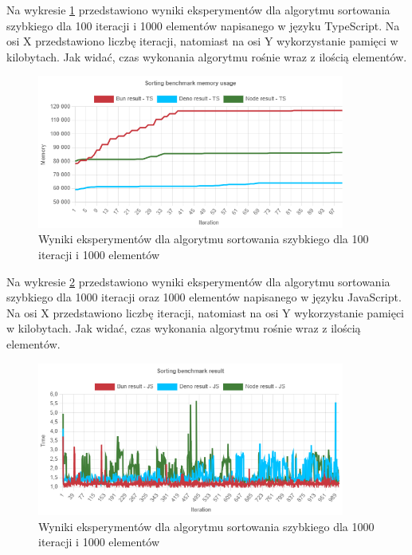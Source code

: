 Na wykresie \ref{fig:quick_sorting_e2_memory_ts} przedstawiono wyniki eksperymentów dla algorytmu sortowania szybkiego dla 100 iteracji i 1000 elementów napisanego w języku TypeScript. Na osi X przedstawiono liczbę iteracji, natomiast na osi Y wykorzystanie pamięci w kilobytach. Jak widać, czas wykonania algorytmu rośnie wraz z ilością elementów.
\begin{figure}[H]
  \centering
  \includegraphics[width=0.9\textwidth]{Figures/sorting/quick/e2_memory_ts.png}
  \caption{Wyniki eksperymentów dla algorytmu sortowania szybkiego dla 100 iteracji i 1000 elementów}
  \label{fig:quick_sorting_e2_memory_ts}
\end{figure}

Na wykresie \ref{fig:quick_sorting_e3} przedstawiono wyniki eksperymentów dla algorytmu sortowania szybkiego dla 1000 iteracji oraz 1000 elementów napisanego w języku JavaScript. Na osi X przedstawiono liczbę iteracji, natomiast na osi Y wykorzystanie pamięci w kilobytach. Jak widać, czas wykonania algorytmu rośnie wraz z ilością elementów.
\begin{figure}[H]
  \centering
  \includegraphics[width=0.9\textwidth]{Figures/sorting/quick/e3_js.png}
  \caption{Wyniki eksperymentów dla algorytmu sortowania szybkiego dla 1000 iteracji i 1000 elementów}
  \label{fig:quick_sorting_e3}
\end{figure}

